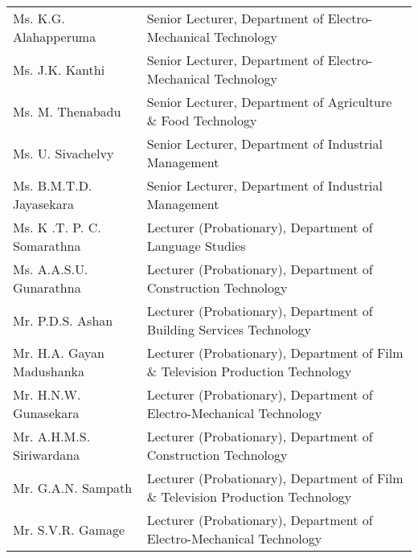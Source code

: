 \begin{longtable}{ L{4.8cm}  L{6.5cm} }
           Ms. K.G. Alahapperuma & Senior Lecturer, Department of  Electro-Mechanical Technology \\

             Ms. J.K. Kanthi & Senior Lecturer, Department of  Electro-Mechanical Technology \\

             Ms. M. Thenabadu & Senior Lecturer, Department of Agriculture \& Food Technology \\

         Ms. U. Sivachelvy & Senior Lecturer, Department of Industrial Management \\

             Ms. B.M.T.D. Jayasekara & Senior Lecturer, Department of Industrial Management \\

    

     

   

     

    
             Ms. K .T. P. C. Somarathna & Lecturer (Probationary), Department of Language Studies \\
     
          Ms. A.A.S.U. Gunarathna & Lecturer (Probationary), Department of Construction Technology \\
      

      

      Mr. P.D.S. Ashan & Lecturer (Probationary), Department of Building Services Technology \\

         Mr. H.A. Gayan Madushanka & Lecturer (Probationary), Department of Film \& Television Production Technology \\

    
         Mr. H.N.W. Gunasekara & Lecturer (Probationary), Department of Electro-Mechanical Technology \\

         Mr. A.H.M.S. Siriwardana & Lecturer (Probationary), Department of Construction Technology \\

         Mr. G.A.N. Sampath & Lecturer (Probationary), Department of Film \& Television Production Technology \\

        Mr. S.V.R. Gamage & Lecturer (Probationary), Department of  Electro-Mechanical Technology \\


\end{longtable}
